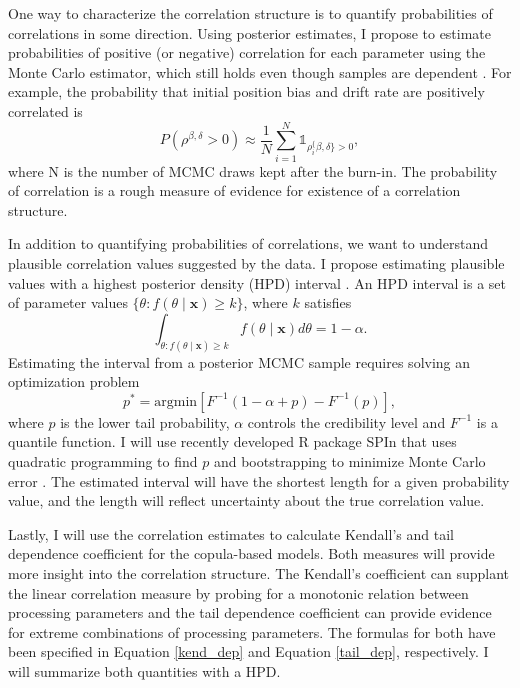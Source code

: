 \documentclass[12pt]{report}
\begin{document}
One way to characterize the correlation structure is to quantify probabilities of correlations in some direction. Using posterior estimates, I propose to estimate probabilities of positive (or negative) correlation for each parameter using the Monte Carlo estimator, which still holds even though samples are dependent \citep{RobCas2004,GivHoe2012}. For example, the probability that initial position bias and drift rate are positively correlated is  
\begin{equation}
P(\rho^{\beta, \delta} > 0) \approx \frac{1}{N} \sum_{i=1}^N\mathds{1}_{\rho_i^\{\beta, \delta\} > 0},
\end{equation}
where N is the number of MCMC draws kept after the burn-in. The probability of correlation is a rough measure of evidence for existence of a correlation structure. 

In addition to quantifying probabilities of correlations, we want to understand plausible correlation values suggested by the data. I propose estimating plausible values with a highest posterior density (HPD) interval \citep{CasBer2002, GelCar2013}. An HPD interval is a set of parameter values $\{\theta: f(\theta \mid \mathbf{x}) \geq k\}$, where $k$ satisfies
\begin{equation}
\int_{\theta:f(\theta \mid \mathbf{x}) \geq k} f(\theta \mid \mathbf{x})d\theta = 1 - \alpha.
\end{equation}
Estimating the interval from a posterior MCMC sample requires solving an optimization problem
\begin{equation}
p^* = \text{argmin}\left[F^{-1}(1 - \alpha + p) - F^{-1}(p)\right],
\end{equation}
where $p$ is the lower tail probability, $\alpha$ controls the credibility level and $F^{-1}$ is a quantile function. I will use recently developed R package SPIn that uses quadratic programming to find $p$ and bootstrapping to minimize Monte Carlo error \citep{LiuGel2013}. The estimated interval will have the shortest length for a given probability value, and the length will reflect uncertainty about the true correlation value. 

Lastly, I will use the correlation estimates to calculate Kendall's and tail dependence coefficient for the copula-based models. Both measures will provide more insight into the correlation structure. The Kendall's coefficient can supplant the linear correlation measure by probing for a monotonic relation between processing parameters and the tail dependence coefficient can provide evidence for extreme combinations of processing parameters. The formulas for both have been specified in Equation \ref{kend_dep} and Equation \ref{tail_dep}, respectively. I will summarize both quantities with a HPD.  
\end{document}
